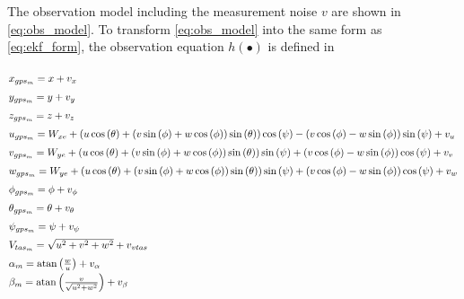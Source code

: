The observation model including the measurement noise $v$ are shown in \autoref{eq:obs_model}. To transform \autoref{eq:obs_model} into the same form as \autoref{eq:ekf_form}, the observation equation $h(\bullet)$ is defined in 

\begin{equation}
    \arraycolsep=1.pt\def\arraystretch{1.5}
    \begin{array}{l}
    {x_{gp{s_m}}} = x + {v_x}\\
    {y_{gp{s_m}}} = y + {v_y}\\
    {z_{gp{s_m}}} = z + {v_z}\\
    {u_{gp{s_m}}} = {W_{xe}} + \left( {u\cos \left( \theta  \right) + \left( {v\sin \left( \phi  \right) + w\cos \left( \phi  \right)} \right)\sin \left( \theta  \right)} \right)\cos \left( \psi  \right) - \left( {v\cos \left( \phi  \right) - w\sin \left( \phi  \right)} \right)\sin \left( \psi  \right) + {v_u}\\
    {v_{gp{s_m}}} = {W_{ye}} + \left( {u\cos \left( \theta  \right) + \left( {v\sin \left( \phi  \right) + w\cos \left( \phi  \right)} \right)\sin \left( \theta  \right)} \right)\sin \left( \psi  \right) + \left( {v\cos \left( \phi  \right) - w\sin \left( \phi  \right)} \right)\cos \left( \psi  \right) + {v_v}\\
    {w_{gp{s_m}}} = {W_{ye}} + \left( {u\cos \left( \theta  \right) + \left( {v\sin \left( \phi  \right) + w\cos \left( \phi  \right)} \right)\sin \left( \theta  \right)} \right)\sin \left( \psi  \right) + \left( {v\cos \left( \phi  \right) - w\sin \left( \phi  \right)} \right)\cos \left( \psi  \right) + {v_w}\\
    {\phi _{gp{s_m}}} = \phi  + {v_\phi }\\
    {\theta _{gp{s_m}}} = \theta  + {v_\theta }\\
    {\psi _{gp{s_m}}} = \psi  + {v_\psi }\\
    {V_{ta{s_m}}} = \sqrt {{u^2} + {v^2} + {w^2}}  + {v_{vtas}}\\
    {\alpha _m} = {\mathop{\rm atan}\nolimits} \left( {\frac{w}{u}} \right) + {v_\alpha }\\
    {\beta _m} = {\mathop{\rm atan}\nolimits} \left( {\frac{v}{{\sqrt {{u^2} + {w^2}} }}} \right) + {v_\beta }
    \end{array} 
    \label{eq:obs_model}
\end{equation}


